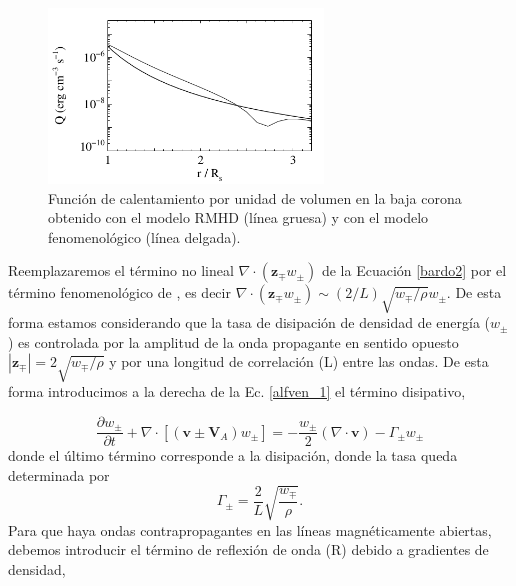 \documentclass[a4paper,11pt]{report}
\begin{document}
\begin{figure}[h]
\begin{center}
\includegraphics[width=0.65\textwidth]{figuras/heating_dmitruk_2002.png}
\end{center}
\caption{Función de calentamiento por unidad de volumen en la baja corona obtenido con el modelo RMHD (línea gruesa) y con el modelo fenomenológico (línea delgada).}
\label{heating}
\end{figure}







Reemplazaremos el término no lineal $\nabla \cdot (\boldsymbol{z}_\mp w_\pm)$ de la Ecuación \ref{bardo2} por el término fenomenológico de \citet{dmitruk_2002}, es decir $\nabla \cdot (\boldsymbol{z}_\mp w_\pm) \sim (2/L)\sqrt{w_\mp/\rho}w_\pm$. De esta forma estamos considerando que la tasa de disipación de densidad de energía ($w_\pm$) es controlada por la amplitud de la onda propagante en sentido opuesto $|\boldsymbol{z_\mp}| = 2 \sqrt{w_\mp/\rho}$ y por una longitud de correlación (L) entre las ondas. De esta forma introducimos a la derecha de la Ec. \ref{alfven_1} el término disipativo,
 
\begin{equation}
  \frac{\partial w_\pm}{\partial t} + \nabla \cdot [(\boldsymbol{v}\pm \boldsymbol{V}_A)w_\pm] = - \frac{w_\pm}{2}(\nabla \cdot \boldsymbol{v}) - \Gamma_{\pm} w_\pm \label{alfven_2}
\end{equation}
donde el último término corresponde a la disipación, donde la tasa queda determinada por
\begin{equation}
  \Gamma_{\pm} = \frac{2}{L}\sqrt{\frac{w_{\mp}}{\rho}}.
\end{equation}
Para que haya ondas contrapropagantes en las líneas magnéticamente abiertas, debemos introducir el término de reflexión de onda (R) debido a gradientes de densidad,
\end{document}
